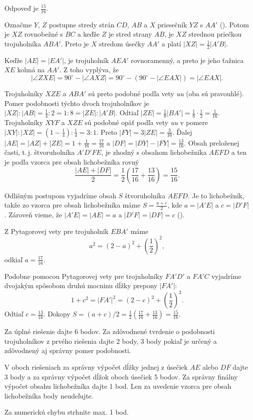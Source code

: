 {%
Odpoveď je $\frac{15}{16}$.

Označme $Y$, $Z$ postupne stredy strán $CD$, $AB$ a $X$ priesečník $YZ$ s $AA'$ (\obr).
Potom je $XZ$ rovnobežné s $BC$ a keďže $Z$ je stred strany $AB$, je $XZ$ strednou priečkou trojuholníka $ABA'$.
Preto je $X$ stredom úsečky $AA'$ a platí $|XZ|= \frac{1}{2} |A'B|$.
%

Keďže $|AE| = |EA'|$, je trojuholník $AEA'$ rovnoramenný, a preto je jeho ťažnica $XE$ kolmá na $AA'$.
Z toho vyplýva, že $$|\angle ZXE| = 90^\circ - |\angle AXZ| = 90^\circ - (90^\circ - |\angle EAX| )=|\angle EAX|.$$

Trojuholníky $XZE$ a $ABA'$ sú preto podobné podľa vety {\it uu} (oba sú pravouhlé).
Pomer podobnosti týchto dvoch trojuholníkov je $|XZ|: |AB| = \frac{1}{4}:2=1:8 = {|ZE|: |A'B|}$.
Odtiaľ $|ZE|=\frac18 |BA'|=\frac18\cdot\frac12=\frac1{16}$.
Trojuholníky $XYF$ a $XZE$ sú podobné opäť podľa vety {\it uu} v pomere $|XY|:|XZ|=(1-\frac{1}{4}):\frac{1}{4} =3:1$.
Preto $|FY|= 3 |ZE|= \frac{3}{16}$.
Ďalej $|AE| = |AZ| + |ZE| = 1 +\frac1{16}=\frac{17}{16}$ a $|DF| = |DY| - |FY| = \frac{13}{16}$.
Obsah preloženej časti, t.\,j. štvoruholníka $A'D'FE$, je zhodný s obsahom lichobežníka $AEFD$ a ten je podľa vzorca pre obsah lichobežníka rovný
$$
\frac{|AE| + |DF|}{2}= \frac{1}{2}\left(\frac{17}{16}+\frac{13}{16} \right)= \frac{15}{16}.
$$

Odlišným postupom vyjadríme obsah $S$ štvoruholníka $AEFD$.
Je to lichobežník, takže zo vzorca pre obsah lichobežníka máme $S=\frac{a+c}{2}$, kde $a=|A'E|$ a $c=|D'F|$. Zároveň vieme, že $|A'E|=|AE|=a$ a $|D'F|=|DF|=c$ (\obr).
%

Z Pytagorovej vety pre trojuholník $EBA'$ máme $$a^2=(2-a)^2+{\left(\frac{1}{2}\right)}^2,$$ odkiaľ $a=\frac{17}{16}$.

Podobne pomocou Pytagorovej vety pre trojuholníky $FA'D'$ a $FA'C$ vyjadríme dvojakým spôsobom druhú mocninu dĺžky prepony $|FA'|$:
$$1+c^2=|FA'|^2= (2-c)^2+{\left(\frac{1}{2}\right)}^2.$$
Odtiaľ $c=\frac{13}{16}$.
Dokopy $S=(a+c)/2=\frac{1}{2}\left(\frac{17}{16}+\frac{13}{16} \right)= \frac{15}{16}$.

\schemaABC
Za úplné riešenie dajte 6 bodov.
Za zdôvodnené tvrdenie o podobnosti trojuholníkov z prvého riešenia dajte 2 body, 3 body pokiaľ je určený a zdôvodnený aj správny pomer podobnosti.

V oboch riešeniach za správny výpočet dĺžky jednej z úsečiek $AE$ alebo $DF$ dajte 3 body a za správny výpočet dĺžok oboch úsečiek 5 bodov.
Za správny finálny výpočet obsahu lichobežníka dajte 1 bod.
Len za uvedenie vzorca pre obsah lichobežníka body neudeľujte.

Za numerickú chybu strhnite max. 1 bod.
\endschema
}

